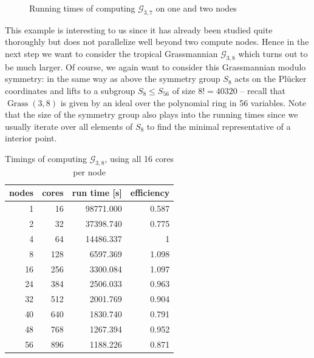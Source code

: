 \documentclass[
  paper=a4,
  titlepage,
  bibliography=totoc,
  pagesize=pdftex
]{scrartcl}
\numberwithin{figure}{section}
\numberwithin{equation}{section}
\numberwithin{table}{section}
\DeclareMathOperator{\Grass}{Grass}
\theoremstyle{definition}
\numberwithin{definition}{section}
\begin{document}
\begin{figure}[htbp]
  \begin{center}
    
  \end{center}
  \caption{Running times of computing $\mathcal{G}_{3,7}$ on one and two nodes}
  \label{fig:g37sc}
\end{figure}

This example is interesting to us since it has already been studied quite thoroughly but
does not parallelize well beyond two compute nodes. Hence in the next step we want to
consider the tropical Grassmannian $\mathcal G_{3,8}$ which turns out to be much larger.
Of course, we again want to consider this Grassmannian modulo symmetry: in the same way as
above the symmetry group $S_8$ acts on the Plücker coordinates and lifts to a subgroup
$S_8 \leq S_{56}$ of size $8!=40320$ -- recall that $\Grass(3,8)$ is given by an ideal
over the polynomial ring in 56 variables. Note that the size of the symmetry group also
plays into the running times since we usually iterate over all elements of $S_8$ to find
the minimal representative of a interior point.

\begin{table}[tbh]
  \centering
  \begin{tabular}{r|r||r|r}
    \textbf{nodes} & \textbf{cores} & \textbf{run time [s]} & \textbf{efficiency} \\
    \hline
     1 &  16 & 98771.000 & 0.587 \\
     2 &  32 & 37398.740 & 0.775 \\
     4 &  64 & 14486.337 & 1     \\
     8 & 128 &  6597.369 & 1.098 \\
    16 & 256 &  3300.084 & 1.097 \\
    24 & 384 &  2506.033 & 0.963 \\
    32 & 512 &  2001.769 & 0.904 \\
    40 & 640 &  1830.740 & 0.791 \\ %
    48 & 768 &  1267.394 & 0.952 \\
    56 & 896 &  1188.226 & 0.871
  \end{tabular}
  \caption{Timings of computing $\mathcal G_{3,8}$, using all 16 cores per node}
  \label{tab:g38}
\end{table}
\end{document}
